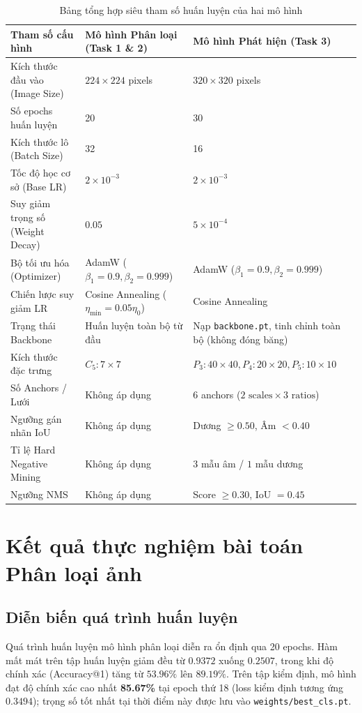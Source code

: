 \documentclass[fontsize=13pt,a4paper,oneside,DIV=calc,chapterprefix=true]{scrbook}
\begin{document}
\begin{table}[H]
\centering
\caption{Bảng tổng hợp siêu tham số huấn luyện của hai mô hình}
\label{tab:hyperparams}
\begin{tabularx}{\textwidth}{lXX}
\toprule
\textbf{Tham số cấu hình} & \textbf{Mô hình Phân loại (Task 1 \& 2)} & \textbf{Mô hình Phát hiện (Task 3)}\\
\midrule
Kích thước đầu vào (Image Size) & $224 \times 224$ pixels & $320 \times 320$ pixels\\
Số epochs huấn luyện & 20 & 30\\
Kích thước lô (Batch Size) & 32 & 16\\
Tốc độ học cơ sở (Base LR) & $2 \times 10^{-3}$ & $2 \times 10^{-3}$\\
Suy giảm trọng số (Weight Decay) & $0.05$ & $5 \times 10^{-4}$\\
Bộ tối ưu hóa (Optimizer) & AdamW ($\beta_1=0.9, \beta_2=0.999$) & AdamW ($\beta_1=0.9, \beta_2=0.999$)\\
Chiến lược suy giảm LR & Cosine Annealing ($\eta_{\min} = 0.05 \eta_0$) & Cosine Annealing\\
Trạng thái Backbone & Huấn luyện toàn bộ từ đầu & Nạp \texttt{backbone.pt}, tinh chỉnh toàn bộ (không đóng băng)\\
Kích thước đặc trưng & $C_5: 7 \times 7$ & $P_3: 40\times 40, P_4: 20\times 20, P_5: 10\times 10$\\
Số Anchors / Lưới & Không áp dụng & 6 anchors ($2 \text{ scales} \times 3 \text{ ratios}$)\\
Ngưỡng gán nhãn IoU & Không áp dụng & Dương $\ge 0.50$, Âm $< 0.40$\\
Tỉ lệ Hard Negative Mining & Không áp dụng & $3$ mẫu âm / $1$ mẫu dương\\
Ngưỡng NMS & Không áp dụng & Score $\ge 0.30$, IoU $= 0.45$\\
\bottomrule
\end{tabularx}
\end{table}

\section{Kết quả thực nghiệm bài toán Phân loại ảnh}

\subsection{Diễn biến quá trình huấn luyện}
Quá trình huấn luyện mô hình phân loại diễn ra ổn định qua 20 epochs. Hàm mất mát trên tập huấn luyện giảm đều từ $0.9372$ xuống $0.2507$, trong khi độ chính xác (Accuracy@1) tăng từ $53.96\%$ lên $89.19\%$. Trên tập kiểm định, mô hình đạt độ chính xác cao nhất \textbf{85.67\%} tại epoch thứ 18 (loss kiểm định tương ứng $0.3494$); trọng số tốt nhất tại thời điểm này được lưu vào \texttt{weights/best\_cls.pt}.
\end{document}
